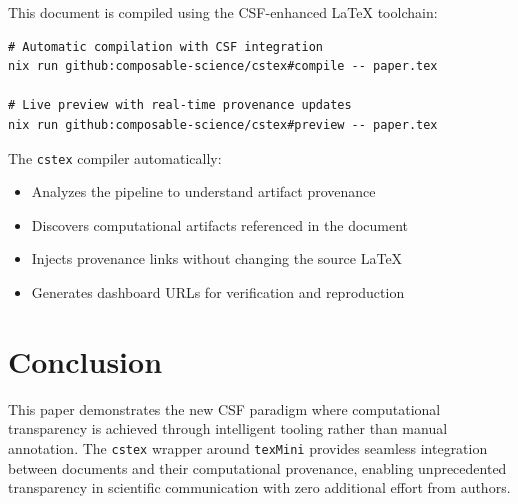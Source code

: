 \documentclass{article}
\begin{document}
This document is compiled using the CSF-enhanced LaTeX toolchain:

\begin{verbatim}
# Automatic compilation with CSF integration
nix run github:composable-science/cstex#compile -- paper.tex

# Live preview with real-time provenance updates  
nix run github:composable-science/cstex#preview -- paper.tex
\end{verbatim}

The \texttt{cstex} compiler automatically:
\begin{itemize}
    \item Analyzes the pipeline to understand artifact provenance
    \item Discovers computational artifacts referenced in the document
    \item Injects provenance links without changing the source LaTeX
    \item Generates dashboard URLs for verification and reproduction
\end{itemize}

\section{Conclusion}

This paper demonstrates the new CSF paradigm where computational transparency
is achieved through intelligent tooling rather than manual annotation.
The \texttt{cstex} wrapper around \texttt{texMini} provides seamless
integration between documents and their computational provenance, enabling
unprecedented transparency in scientific communication with zero additional
effort from authors.
\end{document}
